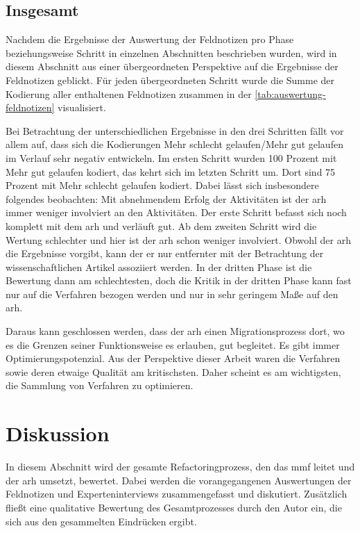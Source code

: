 \subsection{Insgesamt}

Nachdem die Ergebnisse der Auswertung der Feldnotizen pro Phase beziehungsweise Schritt in einzelnen Abschnitten beschrieben wurden, wird in diesem Abschnitt aus einer übergeordneten Perspektive auf die Ergebnisse der Feldnotizen geblickt.
Für jeden übergeordneten Schritt wurde die Summe der Kodierung aller enthaltenen Feldnotizen zusammen in der \cref{tab:auswertung-feldnotizen} visualisiert.


Bei Betrachtung der unterschiedlichen Ergebnisse in den drei Schritten fällt vor allem auf, dass sich die Kodierungen \glqq Mehr schlecht gelaufen\grqq{}/\glqq Mehr gut gelaufen\grqq{} im Verlauf sehr negativ entwickeln.
Im ersten Schritt wurden 100 Prozent mit \glqq Mehr gut gelaufen\grqq{} kodiert, das kehrt sich im letzten Schritt um.
Dort sind 75 Prozent mit \glqq Mehr schlecht gelaufen\grqq{} kodiert.
Dabei lässt sich insbesondere folgendes beobachten: Mit abnehmendem Erfolg der Aktivitäten ist der \gls{arh} immer weniger involviert an den Aktivitäten.
Der erste Schritt befasst sich noch komplett mit dem \gls{arh} und verläuft gut.
Ab dem zweiten Schritt wird die Wertung schlechter und hier ist der \gls{arh} schon weniger involviert.
Obwohl der \gls{arh} die Ergebnisse vorgibt, kann der er nur entfernter mit der Betrachtung der wissenschaftlichen Artikel assoziiert werden.
In der dritten Phase ist die Bewertung dann am schlechtesten, doch die Kritik in der dritten Phase kann fast nur auf die Verfahren bezogen werden und nur in sehr geringem Maße auf den \gls{arh}.

Daraus kann geschlossen werden, dass der \gls{arh} einen Migrationsprozess dort, wo es die Grenzen seiner Funktionsweise es erlauben, gut begleitet.
Es gibt immer Optimierungspotenzial.
Aus der Perspektive dieser Arbeit waren die Verfahren sowie deren etwaige Qualität am kritischsten.
Daher scheint es am wichtigsten, die Sammlung von Verfahren zu optimieren.

\section{Diskussion}
\label{sec:auswertung-diskussion}

In diesem Abschnitt wird der gesamte Refactoringprozess, den das \gls{mmf} leitet und der \gls{arh} umsetzt, bewertet.
Dabei werden die vorangegangenen Auswertungen der Feldnotizen und Experteninterviews zusammengefasst und diskutiert.
Zusätzlich fließt eine qualitative Bewertung des Gesamtprozesses durch den Autor ein, die sich aus den gesammelten Eindrücken ergibt.

